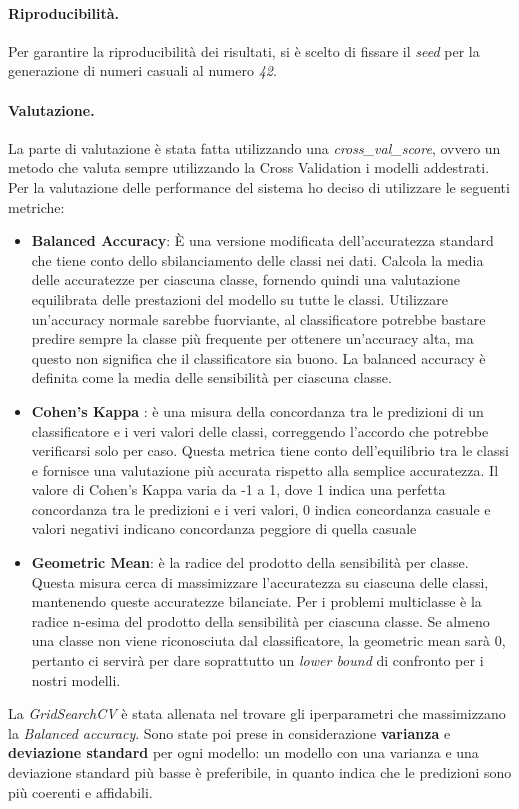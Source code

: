 \paragraph{Riproducibilità.} Per garantire la riproducibilità dei risultati, si è scelto di fissare il \textit{seed} per la generazione di numeri casuali al numero \textit{42}.
\paragraph{Valutazione.} La parte di valutazione è stata fatta utilizzando una \textit{cross\_val\_score}, ovvero un metodo che valuta sempre utilizzando la Cross Validation i modelli addestrati. Per la valutazione delle performance del sistema ho deciso di utilizzare le seguenti metriche:
\begin{itemize}[label=-]
    \item \textbf{Balanced Accuracy}: È una versione modificata dell'accuratezza standard che tiene conto dello sbilanciamento delle classi nei dati. Calcola la media delle accuratezze per ciascuna classe, fornendo quindi una valutazione equilibrata delle prestazioni del modello su tutte le classi. Utilizzare un'accuracy normale sarebbe fuorviante, al classificatore potrebbe bastare predire sempre la classe più frequente per ottenere un'accuracy alta, ma questo non significa che il classificatore sia buono. La balanced accuracy è definita come la media delle sensibilità per ciascuna classe.
    \item \textbf{Cohen's Kappa} \cite{kappa}: è una misura della concordanza tra le predizioni di un classificatore e i veri valori delle classi, correggendo l'accordo che potrebbe verificarsi solo per caso. Questa metrica tiene conto dell'equilibrio tra le classi e fornisce una valutazione più accurata rispetto alla semplice accuratezza. Il valore di Cohen's Kappa varia da -1 a 1, dove 1 indica una perfetta concordanza tra le predizioni e i veri valori, 0 indica concordanza casuale e valori negativi indicano concordanza peggiore di quella casuale
    \item \textbf{Geometric Mean}: è la radice del prodotto della sensibilità per classe. Questa misura cerca di massimizzare l'accuratezza su ciascuna delle classi, mantenendo queste accuratezze bilanciate. Per i problemi multiclasse è la radice n-esima del prodotto della sensibilità per ciascuna classe. Se almeno una classe non viene riconosciuta dal classificatore, la geometric mean sarà 0, pertanto ci servirà per dare soprattutto un \textit{lower bound} di confronto per i nostri modelli.
\end{itemize}
\noindent La \textit{GridSearchCV} è stata allenata nel trovare gli iperparametri che massimizzano la \textit{Balanced accuracy}. Sono state poi prese in considerazione \textbf{varianza} e \textbf{deviazione standard} per ogni modello: un modello con una varianza e una deviazione standard più basse è preferibile, in quanto indica che le predizioni sono più coerenti e affidabili.


